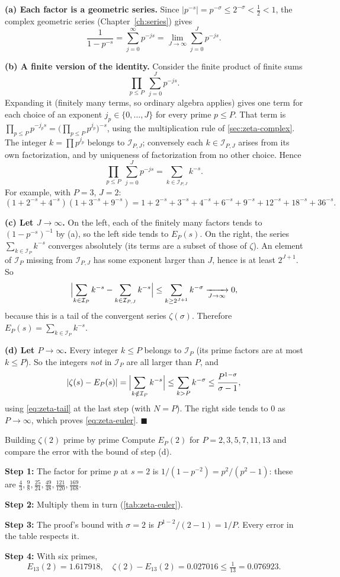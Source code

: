 \textbf{(a) Each factor is a geometric series.} Since $|p^{-s}|=p^{-\sigma}\le2^{-\sigma}<\tfrac12<1$, the complex geometric series (Chapter~\ref{ch:series}) gives
\[
\frac{1}{1-p^{-s}}=\sum_{j=0}^{\infty}p^{-js}=\lim_{J\to\infty}\sum_{j=0}^{J}p^{-js}.
\]

\textbf{(b) A finite version of the identity.} Consider the finite product of finite sums
\[
\prod_{p\le P}\ \sum_{j=0}^{J}p^{-js}.
\]
Expanding it (finitely many terms, so ordinary algebra applies) gives one term for each choice of an exponent $j_p\in\{0,\dots,J\}$ for every prime $p\le P$. That term is $\prod_{p\le P}p^{-j_ps}=\bigl(\prod_{p\le P}p^{j_p}\bigr)^{-s}$, using the multiplication rule of \cref{sec:zeta-complex}. The integer $k=\prod p^{j_p}$ belongs to $\mathcal{I}_{P,J}$; conversely each $k\in \mathcal{I}_{P,J}$ arises from its own factorization, and by uniqueness of factorization from no other choice. Hence
\[
\prod_{p\le P}\ \sum_{j=0}^{J}p^{-js}=\sum_{k\in \mathcal{I}_{P,J}}k^{-s}.
\]
For example, with $P=3$, $J=2$:
\[
(1+2^{-s}+4^{-s})(1+3^{-s}+9^{-s})=1+2^{-s}+3^{-s}+4^{-s}+6^{-s}+9^{-s}+12^{-s}+18^{-s}+36^{-s}.
\]

\textbf{(c) Let $J\to\infty$.} On the left, each of the finitely many factors tends to $(1-p^{-s})^{-1}$ by (a), so the left side tends to $E_P(s)$. On the right, the series $\sum_{k\in \mathcal{I}_P}k^{-s}$ converges absolutely (its terms are a subset of those of $\zeta$). An element of $\mathcal{I}_P$ missing from $\mathcal{I}_{P,J}$ has some exponent larger than $J$, hence is at least $2^{J+1}$. So
\[
\Bigl|\sum_{k\in \mathcal{I}_P}k^{-s}-\sum_{k\in \mathcal{I}_{P,J}}k^{-s}\Bigr|\le\sum_{k\ge 2^{J+1}}k^{-\sigma}\xrightarrow[J\to\infty]{}0,
\]
because this is a tail of the convergent series $\zeta(\sigma)$. Therefore $E_P(s)=\sum_{k\in \mathcal{I}_P}k^{-s}$.

\textbf{(d) Let $P\to\infty$.} Every integer $k\le P$ belongs to $\mathcal{I}_P$ (its prime factors are at most $k\le P$). So the integers \emph{not} in $\mathcal{I}_P$ are all larger than $P$, and
\[
|\zeta(s)-E_P(s)|=\Bigl|\sum_{k\notin \mathcal{I}_P}k^{-s}\Bigr|\le\sum_{k>P}k^{-\sigma}\le\frac{P^{1-\sigma}}{\sigma-1},
\]
using \cref{eq:zeta-tail} at the last step (with $N=P$). The right side tends to $0$ as $P\to\infty$, which proves \cref{eq:zeta-euler}. $\blacksquare$

\begin{sample}{Building $\zeta(2)$ prime by prime}
Compute $E_P(2)$ for $P=2,3,5,7,11,13$ and compare the error with the bound of step (d).

\textbf{Step 1:} The factor for prime $p$ at $s=2$ is $1/(1-p^{-2})=p^2/(p^2-1)$: these are $\frac43,\frac98,\frac{25}{24},\frac{49}{48},\frac{121}{120},\frac{169}{168}$.

\textbf{Step 2:} Multiply them in turn (\cref{tab:zeta-euler}).

\textbf{Step 3:} The proof's bound with $\sigma=2$ is $P^{1-2}/(2-1)=1/P$. Every error in the table respects it.

\textbf{Step 4:} With six primes,
\[
\boxed{E_{13}(2)=1.617918,\quad \zeta(2)-E_{13}(2)=0.027016\le\tfrac1{13}=0.076923.}
\]
\end{sample}

